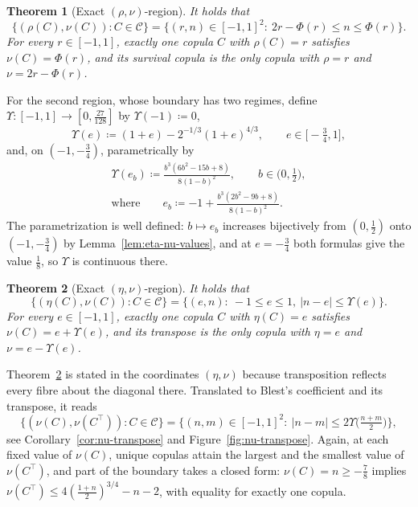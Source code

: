 \documentclass[11pt,a4paper]{article}
\newtheorem{theorem}{Theorem}[section]
\theoremstyle{remark}
\newcommand{\1}{\mathbf{1}}
\newcommand{\CC}{\mathcal{C}}
\begin{document}
\begin{theorem}[Exact $(\rho,\nu)$-region]
\label{thm:rho-nu}
It holds that
\[
  \bigl\{(\rho(C),\nu(C)):C\in\CC\bigr\}
  =\bigl\{(r,n)\in[-1,1]^2:\ 2r-\Phi(r)\le n\le\Phi(r)\bigr\}.
\]
For every $r\in[-1,1]$, exactly one copula $C$ with $\rho(C)=r$ satisfies $\nu(C)=\Phi(r)$, and its survival copula is the only copula with $\rho=r$ and $\nu=2r-\Phi(r)$.
\end{theorem}

For the second region, whose boundary has two regimes, define $\Upsilon:[-1,1]\to[0,\frac{27}{128}]$ by $\Upsilon(-1)\coloneqq0$,
\begin{equation}
  \label{eq:Upsilon-def}
  \Upsilon(e)\coloneqq(1+e)-2^{-1/3}(1+e)^{4/3},
  \qquad e\in\bigl[-\tfrac34,1\bigr],
\end{equation}
and, on $(-1,-\frac34)$, parametrically by
\begin{equation}
  \label{eq:Upsilon-param}
  \begin{gathered}
  \Upsilon(e_b)\coloneqq\frac{b^3(6b^2-15b+8)}{8(1-b)^2},
  \qquad b\in\bigl(0,\tfrac12\bigr),\\[0.5ex]
  \text{where}\qquad
  e_b\coloneqq-1+\frac{b^3(2b^2-9b+8)}{8(1-b)^2}.
  \end{gathered}
\end{equation}
The parametrization is well defined: $b\mapsto e_b$ increases bijectively from $(0,\frac12)$ onto $(-1,-\frac34)$ by Lemma~\ref{lem:eta-nu-values}, and at $e=-\frac34$ both formulas give the value $\frac18$, so $\Upsilon$ is continuous there.

\begin{theorem}[Exact $(\eta,\nu)$-region]
\label{thm:eta-nu}
It holds that
\[
  \bigl\{(\eta(C),\nu(C)):C\in\CC\bigr\}
  =\bigl\{(e,n):\ -1\le e\le1,\ |n-e|\le\Upsilon(e)\bigr\}.
\]
For every $e\in[-1,1]$, exactly one copula $C$ with $\eta(C)=e$ satisfies $\nu(C)=e+\Upsilon(e)$, and its transpose is the only copula with $\eta=e$ and $\nu=e-\Upsilon(e)$.
\end{theorem}

Theorem~\ref{thm:eta-nu} is stated in the coordinates $(\eta,\nu)$ because transposition reflects every fibre about the diagonal there.
Translated to Blest's coefficient and its transpose, it reads
\[
  \bigl\{(\nu(C),\nu(C^\top)):C\in\CC\bigr\}
  =\bigl\{(n,m)\in[-1,1]^2:\ |n-m|\le2\Upsilon\bigl(\tfrac{n+m}{2}\bigr)\bigr\},
\]
see Corollary~\ref{cor:nu-transpose} and Figure~\ref{fig:nu-transpose}.
Again, at each fixed value of $\nu(C)$, unique copulas attain the largest and the smallest value of $\nu(C^\top)$, and part of the boundary takes a closed form: $\nu(C)=n\ge-\frac78$ implies $\nu(C^\top)\le4(\frac{1+n}{2})^{3/4}-n-2$, with equality for exactly one copula.
\end{document}
